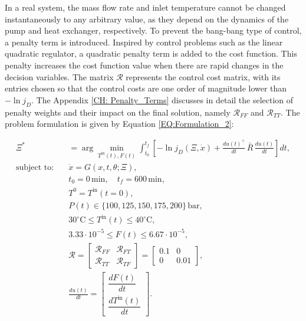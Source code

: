 \documentclass[a4paper,fleqn]{cas-dc}
\begin{document}
		In a real system, the mass flow rate and inlet temperature cannot be changed instantaneously to any arbitrary value, as they depend on the dynamics of the pump and heat exchanger, respectively. To prevent the bang-bang type of control, a penalty term is introduced. Inspired by control problems such as the linear quadratic regulator, a quadratic penalty term is added to the cost function. This penalty increases the cost function value when there are rapid changes in the decision variables. The matrix $\mathcal{R}$ represents the control cost matrix, with its entries chosen so that the control costs are one order of magnitude lower than $-\ln j_D$. The Appendix \ref{CH: Penalty_Terms} discusses in detail the selection of penalty weights and their impact on the final solution, namely $\mathcal{R}_{FF}$ and $\mathcal{R}_{TT}$. The problem formulation is given by Equation \ref{EQ:Formulation_2}:
		
		{\footnotesize 
			\begin{equation}
				\begin{aligned}
					\Xi^* &= \arg \min_{T^{\text{in}}(t), F(t)} 
					\int_{t_0}^{t_f} \left[ - \ln j_D(\Xi, \dot{x}) + 
					\frac{du(t)^\top}{dt} \, \bar{R} \, \frac{du(t)}{dt} \right] dt, \\
					\text{subject to:} \quad 
					& \dot{x} = G(x, t, \theta; \Xi), \\
					& t_0 = 0 \, \text{min}, \quad t_f = 600 \, \text{min}, \\
					& T^0 = T^{\text{in}}(t=0), \\
					& P(t) \in \{100, 125, 150, 175, 200\} \, \text{bar}, \\
					& 30^\circ\text{C} \leq T^{\text{in}}(t) \leq 40^\circ\text{C}, \\
					& 3.33 \cdot 10^{-5} \leq F(t) \leq 6.67 \cdot 10^{-5}, \\
					& \mathcal{R} = 
					\begin{bmatrix} 
						\mathcal{R}_{FF} & \mathcal{R}_{FT} \\ 
						\mathcal{R}_{TT} & \mathcal{R}_{TF} 
					\end{bmatrix}=
					\begin{bmatrix} 
						0.1 & 0 \\ 
						0 & 0.01 
					\end{bmatrix}, \\
					& \frac{du(t)}{dt} = 
					\begin{bmatrix} 
						\dfrac{dF(t)}{dt} \\ 
						\dfrac{dT^{\text{in}}(t)}{dt} 
					\end{bmatrix}.
				\end{aligned}
				\label{EQ:Formulation_2}
		\end{equation} }
		
\end{document}

